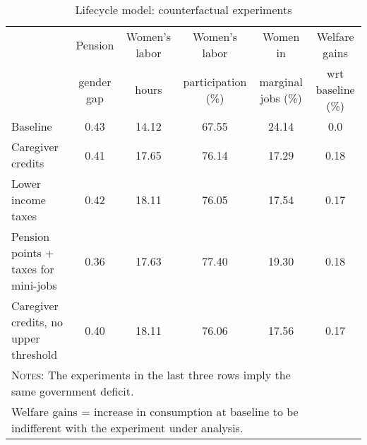 \begin{table}[htbp]\caption{Lifecycle model: counterfactual experiments}\label{table:experiments}\centering\footnotesize\begin{tabular}{lccccc} \toprule & Pension & Women's labor & Women's labor & Women in &  Welfare gains  \\&gender gap &hours &  participation  (\%) & marginal jobs (\%)  & wrt baseline (\%)  \\\midrule    Baseline                                   &0.43&14.12&67.55&24.14& 0.0\\ Caregiver credits                          &0.41&17.65&76.14&17.29&0.18\\ Lower income taxes                         &0.42&18.11&76.05&17.54&0.17\\ Pension points + taxes for mini-jobs&0.36&17.63&77.40&19.30&0.18\\ Caregiver credits, no upper threshold      &0.40&18.11&76.06&17.56&0.17\\ \bottomrule\multicolumn{5}{l}{\textsc{Notes:} The experiments in the last three rows imply the same government deficit.}\\\multicolumn{5}{l}{Welfare gains = increase in consumption at baseline to be indifferent with the experiment under analysis. }\end{tabular}
      \end{table}